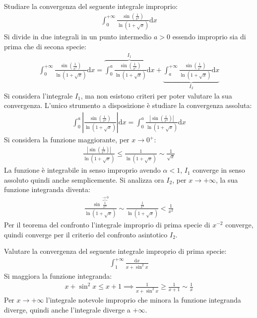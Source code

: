 \documentclass{article}
\newcommand{\df}{\mathrm{d}}
\newcommand{\intab}[4]{\displaystyle\int_{#1}^{#2}{#3}\df{#4}}
\newcommand{\intpinf}[2]{\intab{0}{+\infty}{#1}{#2}}
\numberwithin{equation}{subsection}
\begin{document}
Studiare la convergenza del seguente integrale improprio:
\begin{gather*}
    \intpinf{\frac{\sin\left(\frac{1}{x^2}\right)}{\ln\left(1+\sqrt{x}\right)}}{x}
\end{gather*}
Si divide in due integrali in un punto intermedio $a>0$ essendo improprio sia di prima che di secona specie:
\begin{gather*}
    \intpinf{\frac{\sin\left(\frac{1}{x^2}\right)}{\ln\left(1+\sqrt{x}\right)}}{x}=
    \overbrace{\int_0^a\frac{\sin\left(\frac{1}{x^2}\right)}{\ln\left(1+\sqrt{x}\right)}\df x}^{I_1}+
    \underbrace{\int_a^{+\infty}\frac{\sin\left(\frac{1}{x^2}\right)}{\ln\left(1+\sqrt{x}\right)}\df x}_{I_2}
\end{gather*}
Si considera l'integrale $I_1$, ma non esistono criteri per poter valutare la sua convergenza. L'unico strumento a disposizione è studiare la convergenza assoluta:
\begin{gather*}
    \displaystyle\int_0^a\left|\frac{\sin\left(\frac{1}{x^2}\right)}{\ln\left(1+\sqrt{x}\right)}\right|\df x=\int_0^a\frac{\left|\sin\left(\frac{1}{x^2}\right)\right|}{\ln\left(1+\sqrt{x}\right)}\df x
\end{gather*}
Si considera la funzione maggiorante, per $x\to0^+$:
\begin{gather*}
    \frac{|\sin\left(\frac{1}{x^2}\right)|}{\ln\left(1+\sqrt{x}\right)}\leq\frac{1}{\ln(1+\sqrt{x})}\sim\frac{1}{\sqrt{x}}
\end{gather*}
La funzione è integrabile in senso improprio avendo $\alpha<1$, $I_1$ converge in senso assoluto quindi anche semplicemente. Si analizza ora $I_2$, per $x\to+\infty$, la sua funzione integranda diventa:
\begin{gather*}
    \displaystyle\frac{\sin\overbrace{\frac{1}{x^2}}^{\to0}}{\ln\left(1+\sqrt{x}\right)}\sim
    \frac{\frac{1}{x^2}}{\ln\left(1+\sqrt{x}\right)}<\frac{1}{x^2}
\end{gather*}
Per il teorema del confronto l'integrale improprio di prima specie di $x^{-2}$ converge, quindi converge per il criterio del confronto asintotico $I_2$. 



Valutare la convergenza del seguente integrale improprio di prima specie:
\begin{gather*}
    \displaystyle\int_1^{+\infty}\frac{\df x}{x+\sin^2x}
\end{gather*}
Si maggiora la funzione integranda:
\begin{gather*}
    x+\sin^2x\leq x+1\implies\displaystyle\frac{1}{x+\sin^2x}\geq\frac{1}{x+1}\sim\frac{1}{x}
\end{gather*}
Per $x\to+\infty$ l'integrale notevole improprio che minora la funzione integranda diverge, quindi anche l'integrale diverge a $+\infty$. 
\end{document}
